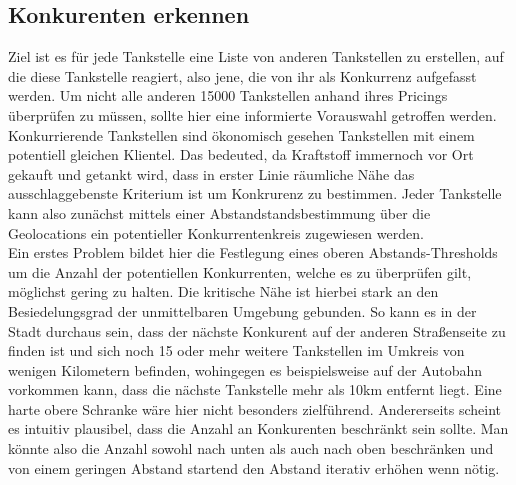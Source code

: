 \documentclass[12pt,a4paper,bibliography=totocnumbered,listof=totocnumbered]{scrartcl}
\begin{document}
\subsection{Konkurenten erkennen}

Ziel ist es für jede Tankstelle eine Liste von anderen Tankstellen zu erstellen, auf die diese Tankstelle reagiert, also jene, die von ihr als Konkurrenz aufgefasst werden. Um nicht alle anderen 15000 Tankstellen anhand ihres Pricings überprüfen zu müssen, sollte hier eine informierte Vorauswahl getroffen werden. Konkurrierende Tankstellen sind ökonomisch gesehen Tankstellen mit einem potentiell gleichen Klientel. Das bedeuted, da Kraftstoff immernoch vor Ort gekauft und getankt wird, dass in erster Linie räumliche Nähe das ausschlaggebenste Kriterium ist um Konkrurenz zu bestimmen. Jeder Tankstelle kann also zunächst mittels einer Abstandstandsbestimmung über die Geolocations ein potentieller Konkurrentenkreis zugewiesen werden.\\

Ein erstes Problem bildet hier die Festlegung eines oberen Abstands-Thresholds um die Anzahl der potentiellen Konkurrenten, welche es zu überprüfen gilt, möglichst gering zu halten. Die kritische Nähe ist hierbei stark an den Besiedelungsgrad der unmittelbaren Umgebung gebunden. So kann es in der Stadt durchaus sein, dass der nächste Konkurent auf der anderen Straßenseite zu finden ist und sich noch 15 oder mehr weitere Tankstellen im Umkreis von wenigen Kilometern befinden, wohingegen es beispielsweise auf der Autobahn vorkommen kann, dass die nächste Tankstelle mehr als 10km entfernt liegt. Eine harte obere Schranke wäre hier nicht besonders zielführend. Andererseits scheint es intuitiv plausibel, dass die Anzahl an Konkurenten beschränkt sein sollte. Man könnte also die Anzahl sowohl nach unten als auch nach oben beschränken und von einem geringen Abstand startend den Abstand iterativ erhöhen wenn nötig.\\
\end{document}
